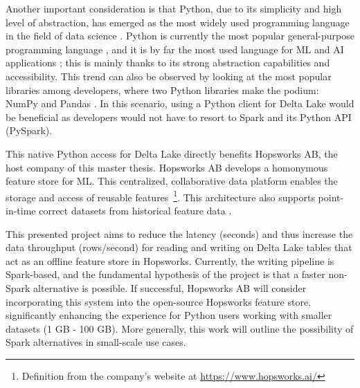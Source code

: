 Another important consideration is that Python, due to its simplicity and high level of abstraction, has emerged as the most widely used programming language in the field of data science \cite{nagpalPythonDataAnalytics2019}. Python is currently the most popular general-purpose programming language \cite{TIOBEIndex, StackOverflowDeveloper}, and it is by far the most used language for \gls{ML} and \gls{AI} applications \cite{python-machine-learning}; this is mainly thanks to its strong abstraction capabilities and accessibility. This trend can also be observed by looking at the most popular libraries among developers, where two Python libraries make the podium: NumPy and Pandas \cite{StackOverflowDeveloper}.
In this scenario, using a Python client for Delta Lake would be beneficial as developers would not have to resort to Spark and its Python \gls{API} (PySpark). 

This native Python access for Delta Lake directly benefits Hopsworks \gls{AB}, the host company of this master thesis. Hopsworks \gls{AB} develops a homonymous feature store for \gls{ML}. This centralized, collaborative data platform enables the storage and access of reusable features~\footnote{Definition from the company's website at \url{https://www.hopsworks.ai/}}. This architecture also supports point-in-time correct datasets from historical feature data \cite{Pettersson1695672}.

This presented project aims to reduce the latency (seconds) and thus increase the data throughput (rows/second) for reading and writing on Delta Lake tables that act as an offline feature store in Hopsworks. Currently, the writing pipeline is Spark-based, and the fundamental hypothesis of the project is that a faster non-Spark alternative is possible. If successful, Hopsworks AB will consider incorporating this system into the open-source Hopsworks feature store, significantly enhancing the experience for Python users working with smaller datasets (1 GB - 100 GB). More generally, this work will outline the possibility of Spark alternatives in small-scale use cases.


